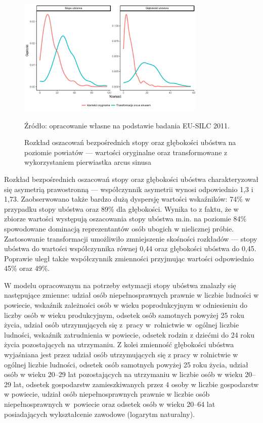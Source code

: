 \begin{figure}[htp]
\centering
\includegraphics[width=0.8\textwidth]{04_wykresy/pow_trans-1.pdf}
\caption{Rozkład oszacowań bezpośrednich stopy oraz głębokości ubóstwa na poziomie powiatów --- wartości oryginalne oraz transformowane z wykorzystaniem pierwiastka arcus sinusa}
\small{Źródło: opracowanie własne na podstawie badania EU-SILC 2011.}
\label{fig:pow_trans}
\end{figure}

Rozkład bezpośrednich oszacowań stopy oraz głębokości ubóstwa charakteryzował się asymetrią prawostronną --- współczynnik asymetrii wynosi odpowiednio 1,3 i 1,73. Zaobserwowano także bardzo dużą dyspersję wartości wskaźników: 74\% w przypadku stopy ubóstwa oraz 89\% dla głębokości. Wynika to z faktu, że w zbiorze wartości występują oszacowania stopy ubóstwa m.in. na poziomie 84\% spowodowane dominacją reprezentantów osób ubogich w nielicznej próbie. Zastosowanie transformacji umożliwiło zmniejszenie skośności rozkładów --- stopy ubóstwa do wartości współczynnika równej 0,44 oraz głębokości ubóstwa do 0,45. Poprawie uległ także współczynnik zmienności przyjmując wartości odpowiednio 45\% oraz 49\%.

W modelu opracowanym na potrzeby estymacji stopy ubóstwa znalazły się następujące zmienne: udział osób niepełnosprawnych prawnie w liczbie ludności w powiecie, wskaźnik zależności osób w wieku poprodukcyjnym w odniesieniu do liczby osób w wieku produkcyjnym, odsetek osób samotnych powyżej 25 roku życia, udział osób utrzymujących się z~pracy w~rolnictwie w~ogólnej liczbie ludności, wskaźnik zatrudnienia w powiecie, odsetek rodzin z dziećmi do 24 roku życia pozostających na utrzymaniu. Z kolei zmienność głębokości ubóstwa wyjaśniana jest przez udział osób utrzymujących się z pracy w rolnictwie w ogólnej liczbie ludności, odsetek osób samotnych powyżej 25 roku życia, udział osób w wieku 20--29 lat pozostających na utrzymaniu w liczbie osób w wieku 20--29 lat, odsetek gospodarstw zamieszkiwanych przez 4 osoby w liczbie gospodarstw w powiecie, udział osób niepełnosprawnych prawnie w liczbie osób niepełnosprawnych w~powiecie oraz odsetek osób w wieku 20--64 lat posiadających wykształcenie zawodowe (logarytm naturalny).

